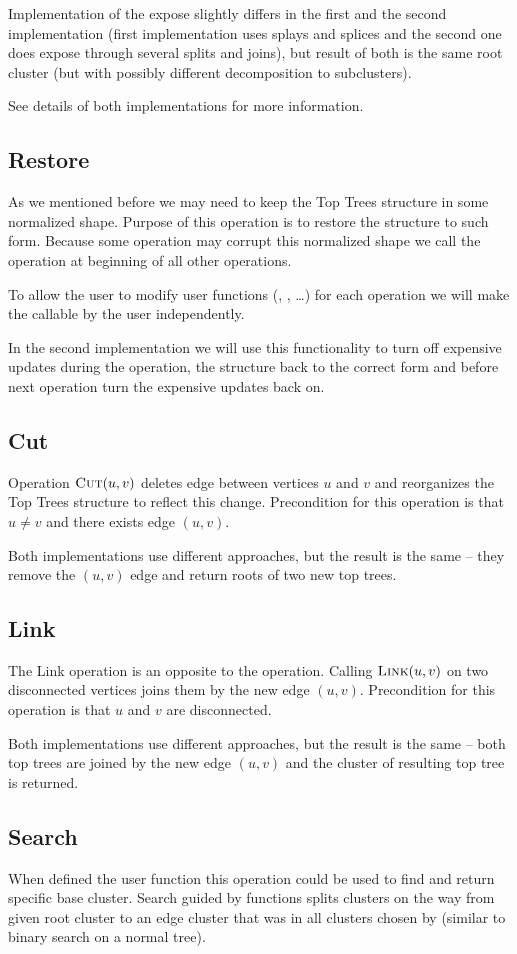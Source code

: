 Implementation of the expose slightly differs in the first and the second
implementation (first implementation uses splays and splices and the second one
does expose through several splits and joins), but result of both is the
same root cluster (but with possibly different decomposition to subclusters).

See details of both implementations for more information.

\subsection{\sc Restore}

As we mentioned before we may need to keep the Top Trees structure in some
normalized shape. Purpose of this operation is to restore the structure
to such form. Because some operation may corrupt this normalized shape we
call the \Restore{} operation at beginning of all other operations.

To allow the user to modify user functions (\Split, \Join, \dots) for each
operation we will make the \Restore{} callable by the user independently.

In the second implementation we will use this functionality to turn off
expensive updates during the \Expose{} operation, \Restore{} the structure back to the
correct form and before next operation turn the expensive updates back on.

\subsection{\sc Cut}

Operation $\hbox{\sc Cut}(u,v)$ deletes edge between vertices $u$ and $v$ and reorganizes
the Top Trees structure to reflect this change. Precondition for this operation
is that $u\ne v$ and there exists edge $(u,v)$.

Both implementations use different approaches, but the result is the same --
they remove the $(u,v)$ edge and return roots of two new top trees.

\subsection{\sc Link}

The Link operation is an opposite to the \Cut{} operation. Calling $\hbox{\sc Link}(u,v)$ on
two disconnected vertices joins them by the new edge $(u,v)$. Precondition for
this operation is that $u$ and $v$ are disconnected.

Both implementations use different approaches, but the result is the same --
both top trees are joined by the new edge $(u,v)$ and the cluster of resulting
top tree is returned.

\subsection{\sc Search}

When defined the \Choose{} user function this operation could be used to find
and return specific base cluster. Search guided by \Choose{} functions splits
clusters on the way from given root cluster to an edge cluster that was in all
clusters chosen by \Choose{} (similar to binary search on a normal tree).
